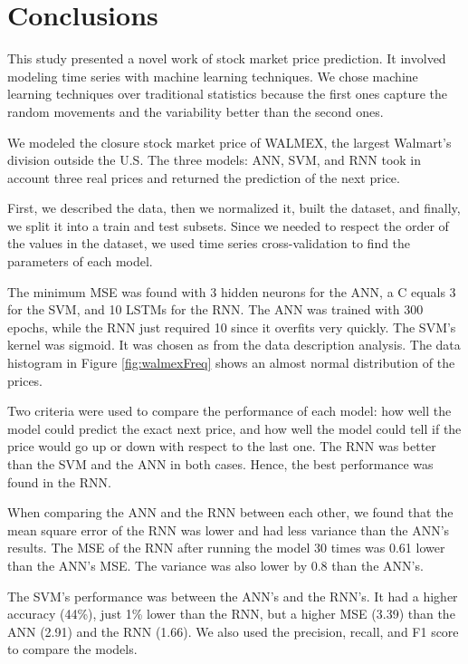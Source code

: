 \chapter{Conclusions}
\label{ch:conclusions}

This study presented a novel work of stock market price prediction. It involved modeling time series with machine learning techniques. We chose machine learning techniques over traditional statistics because the first ones capture the random movements and the variability better than the second ones. 


We modeled the closure stock market price of WALMEX, the largest Walmart's division outside the U.S. The three models: ANN, SVM, and RNN took in account three real prices and returned the prediction of the next price.

First, we described the data, then we normalized it, built the dataset, and finally, we split it into a train and test subsets. Since we needed to respect the order of the values in the dataset, we used time series cross-validation to find the parameters of each model.

The minimum MSE was found with 3 hidden neurons for the ANN, a C equals 3 for the SVM, and 10 LSTMs for the RNN. The ANN was trained with 300 epochs, while the RNN just required 10 since it overfits very quickly. The SVM's kernel was sigmoid. It was chosen as from the data description analysis. The data histogram in Figure \ref{fig:walmexFreq} shows an almost normal distribution of the prices. 

Two criteria were used to compare the performance of each model: how well the model could predict the exact next price, and how well the model could tell if the price would go up or down with respect to the last one. The RNN was better than the SVM and the ANN in both cases. Hence, the best performance was found in the RNN.

When comparing the ANN and the RNN between each other, we found that the mean square error of the RNN was lower and had less variance than the ANN's results. The MSE of the RNN after running the model 30 times was 0.61 lower than the ANN's MSE. The variance was also lower by 0.8 than the ANN's.

The SVM's performance was between the ANN's and the RNN's. It had a higher accuracy (44\%), just 1\% lower than the RNN, but a higher MSE (3.39) than the ANN (2.91) and the RNN (1.66). We also used the precision, recall, and F1 score to compare the models. 

